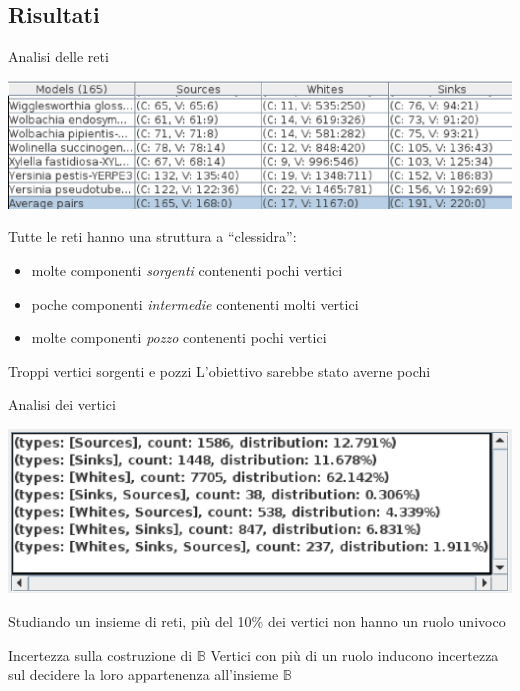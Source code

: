 \documentclass{beamer}
\begin{document}
\subsection{Risultati}

\begin{frame}{Analisi delle reti}
  \begin{center}
    \includegraphics[scale=.5]{images/ResultViewer-table-with-average-row-selected-particular.eps}
  \end{center}
Tutte le reti hanno una struttura a ``clessidra'':
\begin{itemize}
\item molte componenti \emph{sorgenti} contenenti pochi vertici
\item poche componenti \emph{intermedie} contenenti molti vertici
\item molte componenti \emph{pozzo} contenenti pochi vertici
\end{itemize}
\pause
\begin{alertblock}{Troppi vertici sorgenti e pozzi}
  L'obiettivo sarebbe stato averne pochi
\end{alertblock}
\end{frame}

\begin{frame}{Analisi dei vertici}
  \begin{center}
    \includegraphics[scale=.5]{images/ResultViewer-grouping-table-zoom}
  \end{center}
  Studiando un insieme di reti, pi\`u del 10\% dei vertici non hanno
  un ruolo univoco
  \pause
  \begin{alertblock}{Incertezza sulla costruzione di $\mathbb{B}$}
    Vertici con pi\`u di un ruolo inducono incertezza sul decidere la
    loro appartenenza all'insieme $\mathbb{B}$
  \end{alertblock}
\end{frame}
\end{document}

